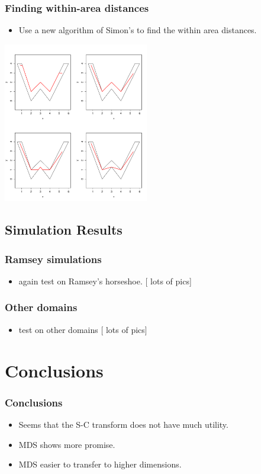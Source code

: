 \documentclass[ignorenonframetext]{beamer} %
\newcommand{\bi}{\begin{itemize}}
\newcommand{\ei}{\end{itemize}}
\begin{document}
\begin{frame}
	\frametitle{Finding within-area distances}
       \bi
         \item Use a new algorithm of Simon's to find the within area distances.
        \ei
            \centering
              \includegraphics[width=2.5in]{figs/doubleyah-example.pdf}\\
\end{frame}



\subsection{Simulation Results}

\begin{frame}
	\frametitle{Ramsey simulations}
       \bi
         \item again test on Ramsey's horseshoe.
         [ lots of pics]
        \ei
\end{frame}


\begin{frame}
	\frametitle{Other domains}
       \bi
         \item test on other domains
         [ lots of pics]
        \ei
\end{frame}

\section{Conclusions}

\begin{frame}
	\frametitle{Conclusions}
       \bi
         \item Seems that the S-C transform does not have much utility.
         \item MDS shows more promise.
         \item MDS easier to transfer to higher dimensions.
          
        \ei
\end{frame}
\end{document}
